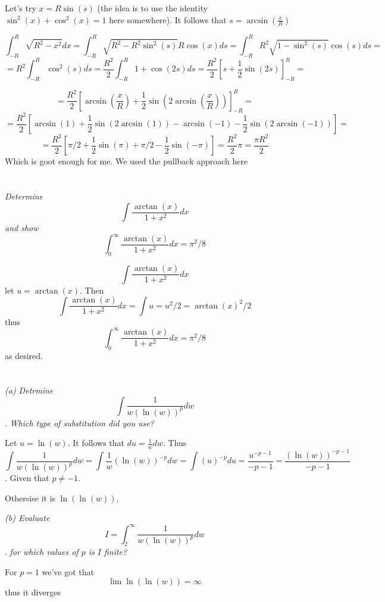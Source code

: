 \documentclass[11pt,oneside,titlepage]{book}
\begin{document}
Let's try $x = R \sin(s)$ (the idea is to use the identity $\sin^2(x) + \cos^2(x) = 1$ here
somewhere). It follows that $s = \arcsin(\frac{x}{R})$



$$\int_{-R}^{R}{\sqrt{R^2 - x^2}dx} =
\int_{-R}^{R}{\sqrt{R^2 - R^2 \sin^2(s)} R\cos(x) ds} =
\int_{-R}^{R}{R^2 \sqrt{1 -  \sin^2(s)} \cos(s) ds} =$$
$$ = 
R^2  \int_{-R}^{R}{\cos^2(s) ds} =
\frac{R^2}{2}  \int_{-R}^{R}{1 + \cos(2s)  ds} =
\frac{R^2}{2}\left[s + \frac{1}{2} \sin(2s)\right]_{-R}^R
=
$$

$$
= \frac{R^2}{2}\left[\arcsin(\frac{x}{R}) + \frac{1}{2} \sin(2\arcsin(\frac{x}{R}))\right]_{-R}^R =
$$
$$
=
\frac{R^2}{2} \left[\arcsin(1) + \frac{1}{2} \sin (2 \arcsin(1)) - \arcsin(-1) -
  \frac{1}{2} \sin (2 \arcsin(-1))\right]= 
$$
$$
=
\frac{R^2}{2} \left[\pi/2 + \frac{1}{2} \sin (\pi) + \pi/2 -
  \frac{1}{2} \sin (-\pi)\right]=
\frac{R^2}{2} \pi = \frac{\pi R^2}{2}
$$
Which is goot enough for me. We used the pullback approach here

\section{}

\textit{Determine }
$$\int {\frac{\arctan(x)}{1 + x^2} dx}$$
\textit{and show }
$$\int_0^\infty {\frac{\arctan(x)}{1 + x^2} dx} = \pi^2/8$$

$$\int {\frac{\arctan(x)}{1 + x^2} dx} $$
let $u = \arctan(x)$. Then
$$\int {\frac{\arctan(x)}{1 + x^2} dx} = \int u = u^2/2 = \arctan(x)^2/2$$
thus
$$\int_0^\infty {\frac{\arctan(x)}{1 + x^2} dx} = \pi^2/8$$
as desired.

\section{}

\textit{(a) Detrmine }
$$\int{\frac{1}{w (\ln(w))^p} dw}$$.
\textit{Which type of substitution did you use?}

Let $u = \ln(w)$. It follows that $du = \frac{1}{w} dw$. Thus
$$\int{\frac{1}{w (\ln(w))^p} dw} =
\int{\frac{1}{w } (\ln(w))^{-p} dw} =
\int{(u)^{-p} du} =  \frac{u^{-p - 1}}{-p - 1} = \frac{(\ln(w))^{-p - 1}}{-p - 1}
$$.
Given that $p \neq -1$.

Othersise it is $\ln(\ln(w))$.

\textit{(b) Evaluate }
$$I = \int_2^\infty{\frac{1}{w (\ln(w))^p} dw}$$.
\textit{for which values of $p$ is $I$ finite?}

For $p = 1$ we've got that
$$\lim{\ln(\ln(w))} = \infty$$
thus it diverges
\end{document}
